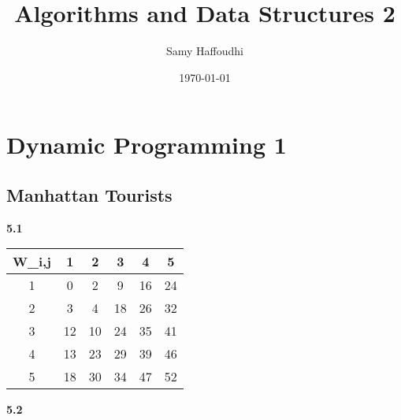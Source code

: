 \documentclass[11pt]{article}
\title{Algorithms and Data Structures 2}
\author{Samy Haffoudhi}
\date{\today}
\begin{document}
\maketitle

\section*{Dynamic Programming 1}
\subsection*{Manhattan Tourists}

\textbf{5.1}
\begin{center}
    \begin{tabular}{ |c||c|c|c|c|c| }
        \hline
        W_{i,j} & 1 & 2 & 3 & 4 & 5 \\
        \hline
        1 & 0 & 2 & 9 & 16 & 24 \\
        \hline
        2 & 3 & 4 & 18 & 26 & 32 \\
        \hline
        3 & 12 & 10 & 24 & 35 & 41 \\
        \hline
        4 & 13 & 23 & 29 & 39 & 46 \\
        \hline
        5 & 18 & 30 & 34 & 47 & 52 \\
        \hline
    \end{tabular}
\end{center}

\textbf{5.2}
\end{document}
